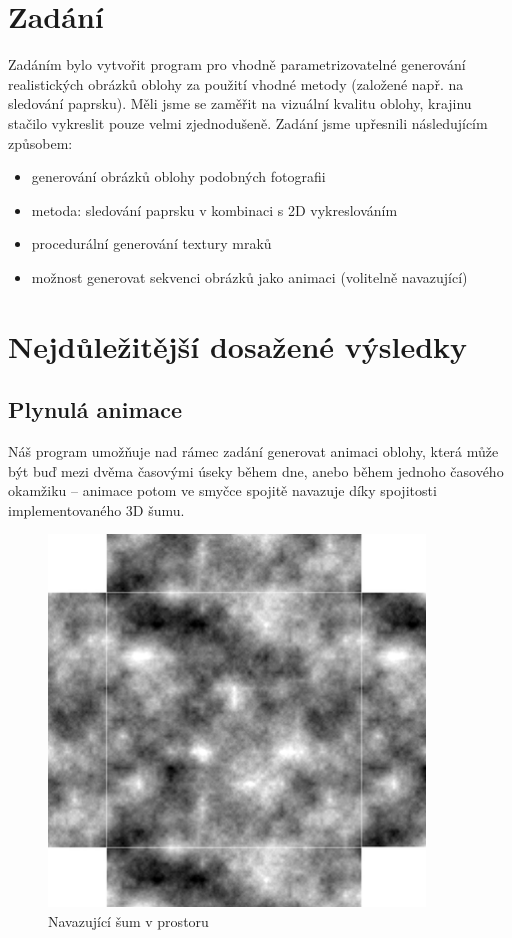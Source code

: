 \documentclass[12pt,a4paper,titlepage,final]{report}
\begin{document}
\chapter{Zadání}

Zadáním bylo vytvořit program pro vhodně parametrizovatelné generování realistických obrázků oblohy za použití vhodné metody (založené např. na sledování paprsku). Měli jsme se zaměřit na vizuální kvalitu oblohy, krajinu stačilo vykreslit pouze velmi zjednodušeně. Zadání jsme upřesnili následujícím způsobem:

\begin{itemize}
    \item generování obrázků oblohy podobných fotografii
    \item metoda: sledování paprsku v kombinaci s 2D vykreslováním
    \item procedurální generování textury mraků
    \item možnost generovat sekvenci obrázků jako animaci (volitelně navazující)
\end{itemize}

\chapter{Nejdůležitější dosažené výsledky}


\section{Plynulá animace}

Náš program umožňuje nad rámec zadání generovat animaci oblohy, která
může být buď mezi dvěma časovými úseky během dne, anebo během jednoho
časového okamžiku -- animace potom ve smyčce spojitě navazuje díky
spojitosti implementovaného 3D šumu.

\begin{figure}[h] \centering
        \includegraphics[width=10cm]{images/navazujici_sum.png}
    \caption{Navazující šum v prostoru} \label{fig:noise_cont_space}
\end{figure}
\end{document}
